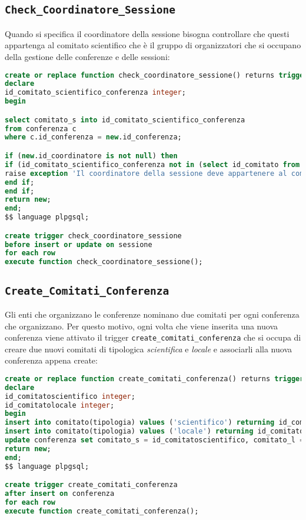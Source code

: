 \subsection{\texttt{Check\_Coordinatore\_Sessione}}
Quando si specifica il coordinatore della sessione bisogna controllare che questi appartenga al comitato scientifico che è il gruppo di organizzatori che si occupano della gestione delle conferenze e delle sessioni:
\begin{lstlisting}[caption={check\_coordinatore\_sessione}, language=sql, style=mystyle]
create or replace function check_coordinatore_sessione() returns trigger as $$
declare 
id_comitato_scientifico_conferenza integer;
begin

select comitato_s into id_comitato_scientifico_conferenza
from conferenza c
where c.id_conferenza = new.id_conferenza;

if (new.id_coordinatore is not null) then
if (id_comitato_scientifico_conferenza not in (select id_comitato from organizzatore_comitato where id_organizzatore = new.id_coordinatore))  then
raise exception 'Il coordinatore della sessione deve appartenere al comitato scientifico della conferenza';
end if;
end if;
return new;
end;
$$ language plpgsql;

create trigger check_coordinatore_sessione
before insert or update on sessione
for each row
execute function check_coordinatore_sessione();

\end{lstlisting}
\subsection{\texttt{Create\_Comitati\_Conferenza}}
Gli enti che organizzano le conferenze nominano due comitati per ogni conferenza che organizzano. Per questo motivo, ogni volta che viene inserita una nuova conferenza viene attivato il trigger \texttt{create\_comitati\_conferenza} che si occupa di creare due nuovi comitati di tipologica \textit{scientifica} e \textit{locale} e associarli alla nuova conferenza appena create:
\begin{lstlisting}[language=SQL, style=mystyle, caption={\texttt{create\_comitati\_conferenza}}]
create or replace function create_comitati_conferenza() returns trigger as $$
declare 
id_comitatoscientifico integer;
id_comitatolocale integer;
begin
insert into comitato(tipologia) values ('scientifico') returning id_comitato into id_comitatoscientifico;
insert into comitato(tipologia) values ('locale') returning id_comitato into id_comitatolocale;
update conferenza set comitato_s = id_comitatoscientifico, comitato_l = id_comitatolocale where id_conferenza = new.id_conferenza;
return new;
end;
$$ language plpgsql;

create trigger create_comitati_conferenza
after insert on conferenza
for each row
execute function create_comitati_conferenza();
\end{lstlisting}
